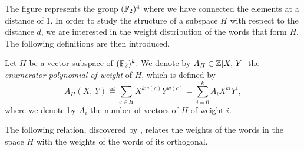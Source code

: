  
 
The figure  represents the group $ (\mathbb{F}_2)^4 $ where we have connected the elements at a distance of 1. In order to study the structure of a subspace $ H $ with respect to the distance $ d $, we are interested in the weight distribution of the words that form $ H $. The following definitions are then introduced.
 
\begin{defn}
 \label{notation-40} Let $ H $ be a vector subspace of $ (\mathbb{F}_2)^k $. We denote by $ A_H \in \mathbb{Z} [X, \, Y] $ the \textit{enumerator polynomial of weight} of $ H $, which is defined by
\begin{equation*}
A_H (X, \, Y) \eqdef \sum_{c \in H}{X^{kw (c)} Y^{w (c)}} = \sum_{i = 0}^{k}{A_i X^{ki} Y^i},
\end{equation*}
where we denote by $ A_i $ the number of vectors of $ H $ of weight $ i $.
\end{defn}
The following relation, discovered by , relates the weights of the words in the space $ H $ with the weights of the words of its orthogonal.
 
